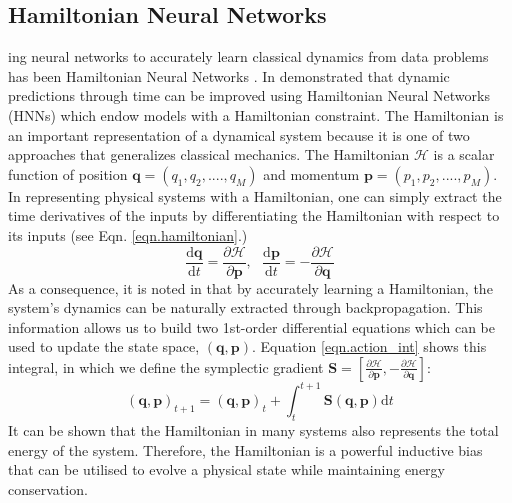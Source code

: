 \documentclass{article}
\begin{document}
\subsection{Hamiltonian Neural Networks}

ing neural networks to accurately learn classical dynamics from data  problems has been Hamiltonian Neural Networks \cite{greydanus_hamiltonian_2019}. In  demonstrated that dynamic predictions through time can be improved using Hamiltonian Neural Networks (HNNs) which endow models with a Hamiltonian constraint. The Hamiltonian is an important representation of a dynamical system because it is one of two approaches that generalizes classical mechanics. The Hamiltonian $\mathcal{H}$ is a scalar function of position $\mathbf{q} = (q_1,q_2,....,q_M)$ and momentum $\mathbf{p} = (p_1,p_2,....,p_M)$. In representing physical systems with a Hamiltonian, one can simply extract the time derivatives of the inputs by differentiating the Hamiltonian with respect to its inputs (see Eqn. \ref{eqn.hamiltonian}.)
\begin{equation}
\frac{\mathrm{d}\mathbf{q}}{\mathrm{d}t} = \frac{\partial \mathcal{H}}{\partial \mathbf{p}}, ~~~
\frac{\mathrm{d}\mathbf{p}}{\mathrm{d}t} = -\frac{\partial \mathcal{H}}{\partial \mathbf{q}}
\label{eqn.hamiltonian}
\end{equation}
As a consequence, it is noted in \cite{greydanus_hamiltonian_2019} that by accurately learning a Hamiltonian, the system's dynamics can be naturally extracted through backpropagation. This information allows us to build two 1st-order differential equations which can be used to update the state space, $(\mathbf{q},\mathbf{p})$. Equation \ref{eqn.action_int} shows this integral, in which we define the symplectic gradient $\mathbf{S}  = \left [ \frac{\partial \mathcal{H}}{\partial \mathbf{p}},-\frac{\partial \mathcal{H}}{\partial \mathbf{q}} \right ] $:
\begin{equation}
(\mathbf{q},\mathbf{p})_{t+1} = (\mathbf{q},\mathbf{p})_t + \int_t^{t+1} \mathbf{S}(\mathbf{q},\mathbf{p}) \mathrm{d}t
\label{eqn.action_int}
\end{equation}
It can be shown that the Hamiltonian in many systems also represents the total energy of the system. Therefore, the Hamiltonian is a powerful inductive bias that can be utilised to evolve a physical state while maintaining energy conservation.
\end{document}
